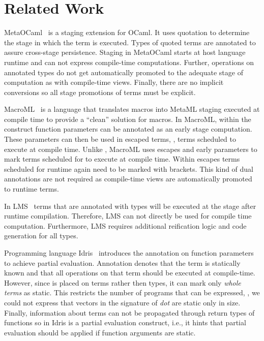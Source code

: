 \section{Related Work}
\label{sct:related-work}

MetaOCaml~\cite{taha_multi-stage_1997,calcagno2003implementing} is a staging extension
 for OCaml. It uses quotation to determine the stage in which the term is executed. Types of quoted terms are annotated
 to assure cross-stage persistence. Staging in MetaOCaml starts at host language runtime and
 can not express compile-time computations. Further, operations on annotated types
 do not get automatically promoted to the adequate stage of computation as with compile-time views.
 Finally, there are no implicit conversions so all stage promotions of terms must be explicit.

MacroML~\cite{ganz2001macros} is a language that translates macros into MetaML staging executed
 at compile time to provide a ``clean'' solution for macros. In MacroML, within
 the  construct function parameters can be annotated as an early stage computation. These parameters
 can then be used in escaped terms, \ie, terms scheduled to execute at compile time. Unlike \tool, MacroML
 uses escapes and early parameters to mark terms scheduled for to execute at compile time. Within
 escapes terms scheduled for runtime again need to be marked with brackets. This kind of dual annotations are
 not required as compile-time views are automatically promoted to runtime terms.

In LMS~\cite{rompf2012lightweight} terms that are annotated with  types will be executed at
 the stage after runtime compilation. Therefore, LMS can not directly be used for compile time computation. Furthermore,
 LMS requires additional reification logic and code generation for all  types.

 Programming language Idris~\cite{brady2010scrapping} introduces the  annotation
  on function parameters to achieve partial evaluation. Annotation  denotes
  that the term is statically known and that all operations on that term should
  be executed at compile-time. However, since  is placed on terms rather
  then types, it can mark only \emph{whole terms} as static. This restricts the number
  of programs that can be expressed, \eg, we could not express that vectors in the
  signature of \emph{dot} are static only in size. Finally, information about 
  terms can not be propagated through return types of functions so 
  in Idris is a partial evaluation construct, i.e., it hints that partial evaluation
  should be applied if function arguments are static.

